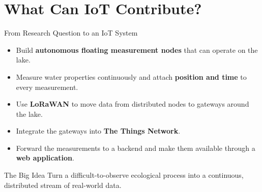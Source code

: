 \part[nopartpage]{What Can IoT Contribute?}

\begin{frame}{From Research Question to an IoT System}
\begin{itemize}
    \item Build \textbf{autonomous floating measurement nodes} that can operate on the lake.
    \item Measure water properties continuously and attach \textbf{position and time} to every measurement.
    \item Use \textbf{LoRaWAN} to move data from distributed nodes to gateways around the lake.
    \item Integrate the gateways into \textbf{The Things Network}.
    \item Forward the measurements to a backend and make them available through a \textbf{web application}.
\end{itemize}
\begin{block}{The Big Idea}
Turn a difficult-to-observe ecological process into a continuous, distributed stream of real-world data.
\end{block}
\end{frame}
